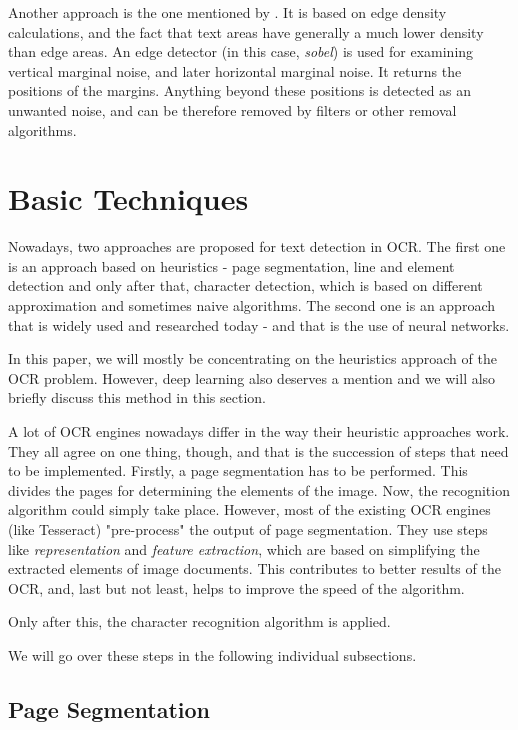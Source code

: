 Another approach is the one mentioned by \citet{marginalNoiseEdge}. It is based on edge density calculations, and the fact that text areas have generally a much lower density than edge areas. An edge detector (in this case, \emph{sobel}) is used for examining vertical marginal noise, and later horizontal marginal noise. It returns the positions of the margins. Anything beyond these positions is detected as an unwanted noise, and can be therefore removed by filters or other removal algorithms.

\section{Basic Techniques}

Nowadays, two approaches are proposed for text detection in OCR. The first one is an approach based on heuristics - page segmentation, line and element detection and only after that, character detection, which is based on different approximation and sometimes naive algorithms. The second one is an approach that is widely used and researched today - and that is the use of neural networks.

In this paper, we will mostly be concentrating on the heuristics approach of the OCR problem. However, deep learning also deserves a mention and we will also briefly discuss this method in this section.

A lot of OCR engines nowadays differ in the way their heuristic approaches work. They all agree on one thing, though, and that is the succession of steps that need to be implemented. Firstly, a page segmentation has to be performed. This divides the pages for determining the elements of the image. Now, the recognition algorithm could simply take place. However, most of the existing OCR engines (like Tesseract) "pre-process" the output of page segmentation. They use steps like \emph{representation} and \emph{feature extraction}, which are based on simplifying the extracted elements of image documents. This contributes to better results of the OCR, and, last but not least, helps to improve the speed of the algorithm.

Only after this, the character recognition algorithm is applied.

We will go over these steps in the following individual subsections.

\subsection{Page Segmentation}

